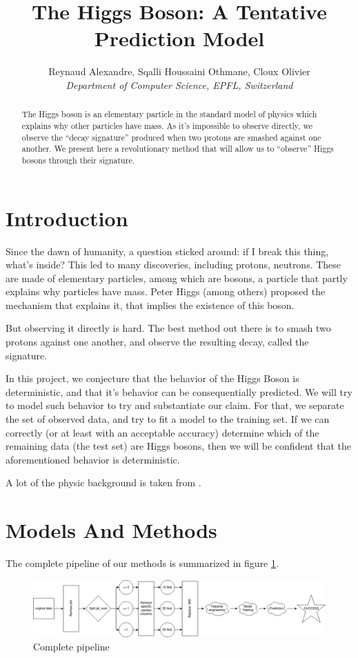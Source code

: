 \documentclass[10pt,conference,compsocconf]{IEEEtran}
\begin{document}
\title{The Higgs Boson: A Tentative Prediction Model}

\author{
  Reynaud Alexandre, Sqalli Houssaini Othmane, Cloux Olivier\\
  \textit{Department of Computer Science, EPFL, Switzerland}
}

\maketitle

\begin{abstract}
The Higgs boson is an elementary particle in the standard model of physics which explains why other particles have mass. As it's impossible to observe directly, we observe the ``decay signature'' produced when two protons are smashed against one another. We present here a revolutionary method that will allow us to ``observe'' Higgs bosons through their signature.
\end{abstract}

\section{Introduction}
Since the dawn of humanity, a question sticked around: if I break this thing, what's inside? This led to many discoveries, including protons, neutrons. These are made of elementary particles\cite{elementPart}, among which are bosons, a particle that partly explains why particles have mass. Peter Higgs (among others) proposed the mechanism that explains it, that implies the existence of this boson.

But observing it directly is hard. The best method out there is to smash two protons against one another, and observe the resulting decay, called the signature.

In this project, we conjecture that the behavior of the Higgs Boson is deterministic, and that it's behavior can be consequentially predicted. We will try to model such behavior to try and substantiate our claim. For that, we separate the set of observed data, and try to fit a model to the training set. If we can correctly (or at least with an acceptable accuracy) determine which of the remaining data (the test set) are Higgs bosons, then we will be confident that the aforementioned behavior is deterministic.

A lot of the physic background is taken from \cite{higgsBoson}.
\section{Models And Methods}
The complete pipeline of our methods is summarized in figure \ref{fig:my_label}.
\begin{figure}
    \centering
    \includegraphics[scale=0.45]{pipeline.png}
    \caption{Complete pipeline}
    \label{fig:my_label}
\end{figure}
\end{document}
